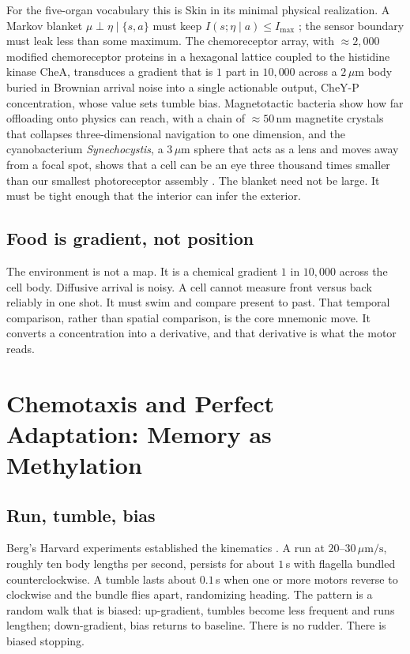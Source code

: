 \documentclass[12pt,a4paper]{article}
\begin{document}
For the five-organ vocabulary this is Skin in its minimal physical realization. A Markov blanket $\mu \perp \eta \mid \{s,a\}$ must keep $I(s;\eta \mid a) \leq I_{\max}$ \cite{friston2013}; the sensor boundary must leak less than some maximum. The chemoreceptor array, with $\approx 2{,}000$ modified chemoreceptor proteins in a hexagonal lattice coupled to the histidine kinase CheA, transduces a gradient that is $1$ part in $10{,}000$ across a $2\,\mu\mathrm{m}$ body buried in Brownian arrival noise into a single actionable output, CheY-P concentration, whose value sets tumble bias. Magnetotactic bacteria show how far offloading onto physics can reach, with a chain of $\approx 50$\,nm magnetite crystals that collapses three-dimensional navigation to one dimension, and the cyanobacterium \emph{Synechocystis}, a $3\,\mu\mathrm{m}$ sphere that acts as a lens and moves away from a focal spot, shows that a cell can be an eye three thousand times smaller than our smallest photoreceptor assembly \cite{schuergers2016}. The blanket need not be large. It must be tight enough that the interior can infer the exterior.

\subsection{Food is gradient, not position}

The environment is not a map. It is a chemical gradient $1$ in $10{,}000$ across the cell body. Diffusive arrival is noisy. A cell cannot measure front versus back reliably in one shot. It must swim and compare present to past. That temporal comparison, rather than spatial comparison, is the core mnemonic move. It converts a concentration into a derivative, and that derivative is what the motor reads.

\section{Chemotaxis and Perfect Adaptation: Memory as Methylation}
\label{sec:chemotaxis}

\subsection{Run, tumble, bias}

Berg's Harvard experiments established the kinematics \cite{berg1972,berg1973,berg2004}. A run at $20$--$30\,\mu\mathrm{m/s}$, roughly ten body lengths per second, persists for about $1$\,s with flagella bundled counterclockwise. A tumble lasts about $0.1$\,s when one or more motors reverse to clockwise and the bundle flies apart, randomizing heading. The pattern is a random walk that is biased: up-gradient, tumbles become less frequent and runs lengthen; down-gradient, bias returns to baseline. There is no rudder. There is biased stopping.
\end{document}
